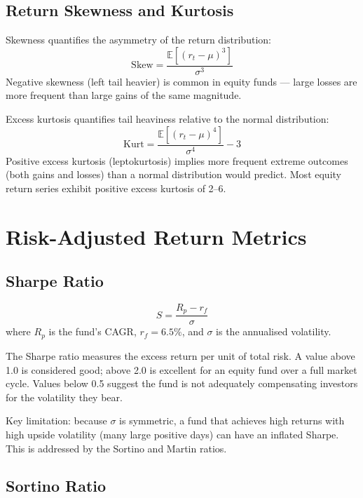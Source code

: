 \documentclass[12pt, a4paper]{article}
\newcommand{\rf}{r_f}
\newcommand{\E}{\mathbb{E}}
\begin{document}
\subsection{Return Skewness and Kurtosis}

Skewness quantifies the asymmetry of the return distribution:
\[
  \text{Skew} = \frac{\E[(r_t - \mu)^3]}{\sigma^3}
\]
Negative skewness (left tail heavier) is common in equity funds — large
losses are more frequent than large gains of the same magnitude.

Excess kurtosis quantifies tail heaviness relative to the normal
distribution:
\[
  \text{Kurt} = \frac{\E[(r_t - \mu)^4]}{\sigma^4} - 3
\]
Positive excess kurtosis (leptokurtosis) implies more frequent extreme
outcomes (both gains and losses) than a normal distribution would predict.
Most equity return series exhibit positive excess kurtosis of 2--6.

\section{Risk-Adjusted Return Metrics}

\subsection{Sharpe Ratio}

\begin{definition}
\[
  S = \frac{R_p - \rf}{\sigma}
\]
where $R_p$ is the fund's CAGR, $\rf = 6.5\%$, and $\sigma$ is the
annualised volatility.
\end{definition}

\begin{interpretation}
The Sharpe ratio measures the excess return per unit of total risk.  A
value above 1.0 is considered good; above 2.0 is excellent for an equity
fund over a full market cycle.  Values below 0.5 suggest the fund is not
adequately compensating investors for the volatility they bear.

Key limitation: because $\sigma$ is symmetric, a fund that achieves high
returns with high upside volatility (many large positive days) can have an
inflated Sharpe.  This is addressed by the Sortino and Martin ratios.
\end{interpretation}

\subsection{Sortino Ratio}
\end{document}
